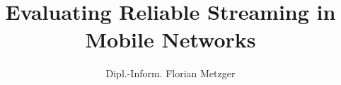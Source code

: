 
\title{Evaluating Reliable Streaming in Mobile Networks}
\author{Dipl.-Inform. Florian Metzger}
\newcommand{\betreuer}{Univ.-Prof.~Dipl.-Ing.~Dr.~Helmut Hlavacs}
\newcommand{\gutachterA}{Univ.-Prof.~Dipl.-Math.~Dr.~Peter Reichl,~M.A.~St.}
\newcommand{\gutachterB}{Prof.~Dr.-Ing.~Phuoc Tran-Gia}

\newcommand{\dissertationsgebiet}{Informatik}
\newcommand{\studienkennzahl}{A 786 880}
\newcommand{\akademischergrad}{Doktor der technischen Wissenschaften (Dr. tech.)}

